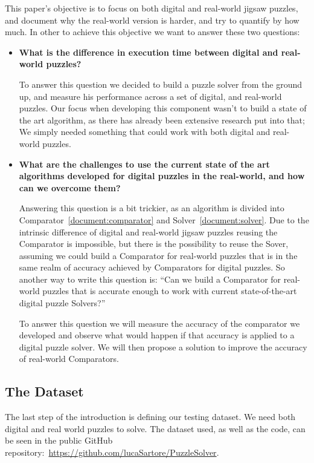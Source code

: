 \documentclass{article}
\begin{document}
This paper’s objective is to focus on both digital and real-world jigsaw puzzles,
and document why the real-world version is harder, and try to quantify by how much.
In other to achieve this objective we want to answer these two questions:
\begin{itemize}
  \item \textbf{What is the difference in execution time between
                digital and real-world puzzles?}
  
  To answer this question we decided to build a puzzle solver from the ground up,
  and measure his performance across a set of digital, and real-world puzzles.
  Our focus when developing this component wasn't to build a state of the art algorithm,
  as there has already been extensive research put into that;
  We simply needed something that could work with both digital and real-world puzzles.
  
  \item \textbf{What are the challenges to use the current state of the art algorithms developed for digital
                puzzles in the real-world, and how can we overcome them?}
  
	Answering this question is a bit trickier, as an algorithm is divided into Comparator~\cref{document:comparator}
  and Solver~\cref{document:solver}. Due to the intrinsic difference of digital and real-world jigsaw puzzles
  reusing the Comparator is impossible, but there is the possibility to reuse the Sover,
  assuming we could build a Comparator for real-world puzzles that is in the same realm
  of accuracy achieved by Comparators for digital puzzles.
  So another way to write this question is: ``Can we build a Comparator for real-world
  puzzles that is accurate enough to work with current state-of-the-art  digital
  puzzle Solvers?''

	To answer this question we will measure the accuracy of the comparator we developed
  and observe what would happen if that accuracy is
  applied to a digital puzzle solver. We will then propose a solution to improve
  the accuracy of real-world Comparators.


\end{itemize}

\subsection{The Dataset}
The last step of the introduction is defining our
testing dataset. We need both digital and real world
puzzles to solve. The dataset used, as well as
the code, can be seen in the public GitHub
repository:~\url{https://github.com/lucaSartore/PuzzleSolver}.
\label{document:dataset}
\end{document}
